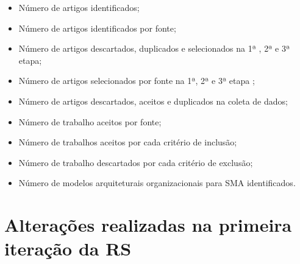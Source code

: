 \begin{itemize}
  \item Número de artigos identificados;
  \item Número de artigos identificados por fonte;
  \item Número de artigos descartados, duplicados e selecionados na 1ª , 2ª e 3ª etapa;
  \item Número de artigos selecionados por fonte na 1ª, 2ª e 3ª etapa ;
  \item Número de artigos descartados, aceitos e duplicados na coleta de dados;
  \item Número de trabalho aceitos por fonte;
  \item Número de trabalhos aceitos por cada critério de inclusão;
  \item Número de trabalho descartados por cada critério de exclusão;
  \item Número de modelos arquiteturais organizacionais para SMA identificados.
\end{itemize}


\section{Alterações realizadas na primeira iteração da RS}








